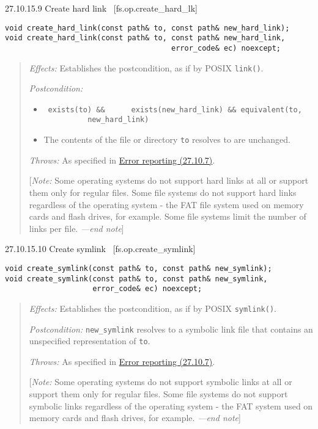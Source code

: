 27.10.15.9 Create hard link~ {[}fs.op.create\_hard\_lk{]}

\begin{verbatim}
void create_hard_link(const path& to, const path& new_hard_link);
void create_hard_link(const path& to, const path& new_hard_link,
                                      error_code& ec) noexcept;
\end{verbatim}

\begin{quote}
\emph{Effects:} Establishes the postcondition, as if by POSIX
\texttt{link()}.

\emph{Postcondition:}

\begin{itemize}
\tightlist
\item
  ~\texttt{exists(to)\ \&\&\ \ \ \ \ \ exists(}\texttt{new\_hard\_link}\texttt{)\ \&\&\ equivalent(to,\ \ \ \ \ \ \ \ \ \ \ \ }\texttt{new\_hard\_link}\texttt{)}
\item
  The contents of the file or directory \texttt{to} resolves to are
  unchanged.
\end{itemize}

\emph{Throws:} As specified in \hyperref[Error-reporting]{Error
reporting (27.10.7)}.

{[}\emph{Note:} Some operating systems do not support hard links at all
or support them only for regular files. Some file systems do not support
hard links regardless of the operating system - the FAT file system used
on memory cards and flash drives, for example. Some file systems limit
the number of links per file. \emph{---end note}{]}
\end{quote}

27.10.15.10 Create symlink~ {[}fs.op.create\_symlink{]}

\begin{verbatim}
void create_symlink(const path& to, const path& new_symlink);
void create_symlink(const path& to, const path& new_symlink,
                    error_code& ec) noexcept;
\end{verbatim}

\begin{quote}
\emph{Effects:} Establishes the postcondition, as if by POSIX
\texttt{symlink()}.

\emph{Postcondition:} \texttt{new\_symlink} resolves to a symbolic link
file that contains an unspecified representation of \texttt{to}.

\emph{Throws:} As specified in \hyperref[Error-reporting]{Error
reporting (27.10.7)}.

{[}\emph{Note:} Some operating systems do not support symbolic links at
all or support them only for regular files. Some file systems do not
support symbolic links regardless of the operating system - the FAT
system used on memory cards and flash drives, for example. \emph{---end
note}{]}
\end{quote}

